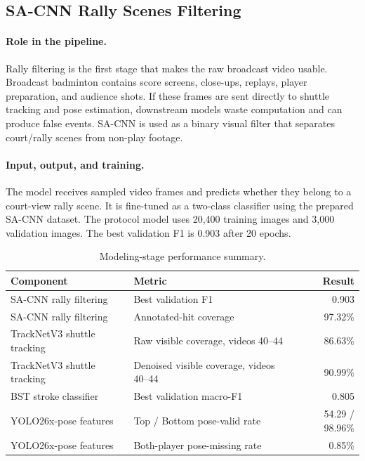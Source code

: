 \documentclass{article}
\begin{document}
\subsection{SA-CNN Rally Scenes Filtering}

\paragraph{Role in the pipeline.}
Rally filtering is the first stage that makes the raw broadcast video usable.
Broadcast badminton contains score screens, close-ups, replays, player
preparation, and audience shots. If these frames are sent directly to shuttle
tracking and pose estimation, downstream models waste computation and can
produce false events. SA-CNN is used as a binary visual filter that separates
court/rally scenes from non-play footage.

\paragraph{Input, output, and training.}
The model receives sampled video frames and predicts whether they belong to a
court-view rally scene. It is fine-tuned as a two-class classifier using the
prepared SA-CNN dataset. The protocol model uses 20,400 training images and
3,000 validation images. The best validation F1 is 0.903 after 20 epochs.

\begin{table}[t]
  \caption{Modeling-stage performance summary.}
  \label{tab:components}
  \centering
  \small
  \begin{tabular}{llr}
    \toprule
    Component & Metric & Result \\
    \midrule
    SA-CNN rally filtering & Best validation F1 & 0.903 \\
    SA-CNN rally filtering & Annotated-hit coverage & 97.32\% \\
    TrackNetV3 shuttle tracking & Raw visible coverage, videos 40--44 & 86.63\% \\
    TrackNetV3 shuttle tracking & Denoised visible coverage, videos 40--44 & 90.99\% \\
    BST stroke classifier & Best validation macro-F1 & 0.805 \\
    YOLO26x-pose features & Top / Bottom pose-valid rate & 54.29 / 98.96\% \\
    YOLO26x-pose features & Both-player pose-missing rate & 0.85\% \\
    \bottomrule
  \end{tabular}
\end{table}
\end{document}
